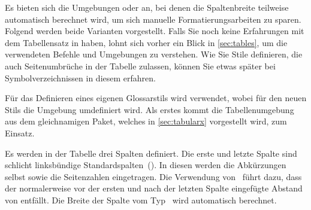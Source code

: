 \documentclass[%
  english,ngerman,%
  geometry=no,DIV=12,automark,%
]{tudscrartcl}
\begin{document}
Es bieten sich die Umgebungen  oder  
an, bei denen die Spaltenbreite teilweise automatisch berechnet wird, um sich 
manuelle Formatierungsarbeiten zu sparen. Folgend werden beide Varianten 
vorgestellt. Falls Sie noch keine Erfahrungen mit dem Tabellensatz in 
 haben, lohnt sich vorher ein Blick in \autoref{sec:tables}, um 
die verwendeten Befehle und Umgebungen zu verstehen. Wie Sie Stile definieren, 
die auch Seitenumbrüche in der Tabelle zulassen, können Sie etwas später bei 
Symbolverzeichnissen in diesem  erfahren.

Für das Definieren eines eigenen Glossarstils wird  
verwendet, wobei für den neuen Stils die Umgebung  
umdefiniert wird. Als erstes kommt die Tabellenumgebung  
aus dem gleichnamigen Paket, welches in \autoref{sec:tabularx} vorgestellt 
wird, zum Einsatz.

Es werden in der Tabelle drei Spalten definiert. Die erste und letzte Spalte 
sind schlicht linksbündige Standardspalten~(). In diesen werden die 
Abkürzungen selbst sowie die Seitenzahlen eingetragen. Die Verwendung 
von~ führt dazu, dass der normalerweise vor der ersten und nach 
der letzten Spalte eingefügte Abstand von  entfällt. Die 
Breite der Spalte vom Typ~ wird automatisch berechnet.
\end{document}
